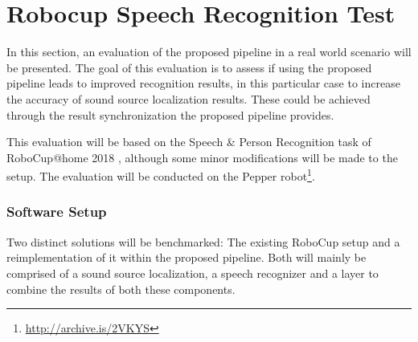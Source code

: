 
\section{Robocup Speech Recognition Test}
\label{eval:task_start}
In this section, an evaluation of the proposed pipeline in a real world scenario will be presented.
The goal of this evaluation is to assess if using the proposed pipeline leads to improved recognition results, in this particular case to increase the accuracy of sound source localization results.
These could be achieved through the result synchronization the proposed pipeline provides.

This evaluation will be based on the Speech \& Person Recognition task of RoboCup@home 2018 \cite{rulebook_2018}, although some minor modifications will be made to the setup.
The evaluation will be conducted on the Pepper robot\footnote{\url{http://archive.is/2VKYS}}.

\subsubsection{Software Setup}
Two distinct solutions will be benchmarked:
The existing RoboCup setup and a reimplementation of it within the proposed pipeline.
Both will mainly be comprised of a sound source localization, a speech recognizer and a layer to combine the results of both these components.

